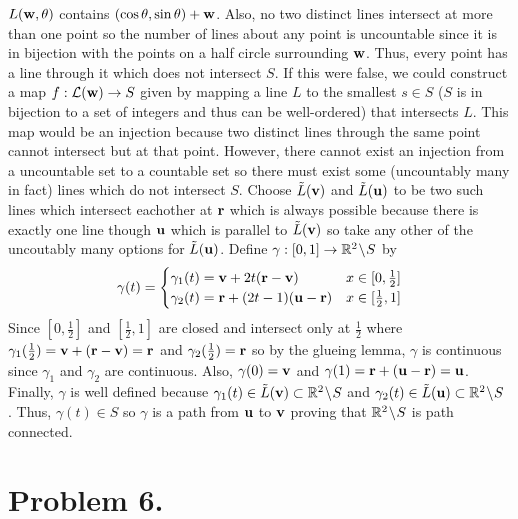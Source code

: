 \documentclass[12pt]{extarticle}
\begin{document}
$L(\bf{w}, \theta)$ contains $(\cos{\theta}, \sin{\theta}) + \bf{w}$. Also, no two distinct lines intersect at more than one point so the number of lines about any point is uncountable since it is in bijection with the points on a half circle surrounding $\bf{w}$. Thus, every point has a line through it which does not intersect $S$. If this were false, we could construct a map $f : \mathcal{L}(\bf{w}) \to S$ given by mapping a line $L$ to the smallest $s \in S$ ($S$ is in bijection to a set of integers and thus can be well-ordered) that intersects $L$. This map would be an injection because two distinct lines through the same point cannot intersect but at that point. However, there cannot exist an injection from a uncountable set to a countable set so there must exist some (uncountably many in fact) lines which do not intersect $S$. Choose $\tilde{L}(\bf{v})$ and $\tilde{L}(\bf{u})$ to be two such lines which intersect eachother at $\bf{r}$ which is always possible because there is exactly one line though $\bf{u}$ which is parallel to $\tilde{L}(\bf{v})$ so take any other of the uncoutably many options for $\tilde{L}(\bf{u})$. Define $\gamma : [0, 1] \to \R^2 \sm S$ by 
\[ \gamma(t) =  
\begin{cases}
\gamma_1(t) = \bf{v} + 2t(\bf{r} - \bf{v}) & x \in [0, \tfrac{1}{2}] \\
\gamma_2(t) = \bf{r} + (2t - 1)(\bf{u} - \bf{r}) & x \in [\tfrac{1}{2}, 1]
\end{cases}
\]
Since $[0, \tfrac{1}{2}]$ and $[\tfrac{1}{2}, 1]$ are closed and intersect only at $\frac{1}{2}$ where $\gamma_1(\frac{1}{2}) = \bf{v} + (\bf{r} - \bf{v}) = \bf{r}$ and $\gamma_2(\frac{1}{2}) = \bf{r}$ so by the glueing lemma, $\gamma$ is continuous since $\gamma_1$ and $\gamma_2$ are continuous. Also, $\gamma(0) = \bf{v}$ and $\gamma(1) = \bf{r} + (\bf{u} - \bf{r}) = \bf{u}$. Finally, $\gamma$ is well defined because $\gamma_1(t) \in \tilde{L}(\bf{v}) \subset \R^2 \sm S$ and $\gamma_2(t) \in \tilde{L}(\bf{u}) \subset \R^2 \sm S$ . Thus, $\gamma(t) \in S$ so $\gamma$ is a path from $\bf{u}$ to $\bf{v}$ proving that $\R^2 \sm S$ is path connected.    

\section*{Problem 6.}
\end{document}
